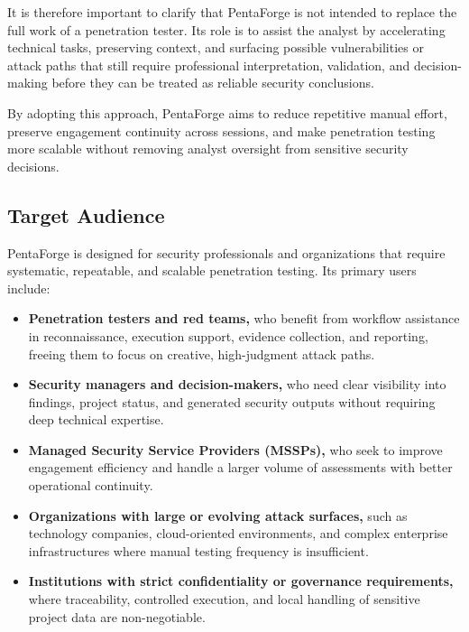 \documentclass[12pt,a4paper]{report}
\begin{document}
It is therefore important to clarify that PentaForge is not intended to replace the
full work of a penetration tester. Its role is to assist the analyst by accelerating
technical tasks, preserving context, and surfacing possible vulnerabilities or attack
paths that still require professional interpretation, validation, and decision-making
before they can be treated as reliable security conclusions.

By adopting this approach, PentaForge aims to reduce repetitive manual effort,
preserve engagement continuity across sessions, and make penetration testing more
scalable without removing analyst oversight from sensitive security decisions.

\subsection{Target Audience}

PentaForge is designed for security professionals and organizations that require
systematic, repeatable, and scalable penetration testing. Its primary users include:

\begin{itemize}
    \item \textbf{Penetration testers and red teams,} who benefit from workflow
    assistance in reconnaissance, execution support, evidence collection, and
    reporting, freeing them to focus on creative, high-judgment attack paths.

    \item \textbf{Security managers and decision-makers,} who need clear visibility
    into findings, project status, and generated security outputs without requiring
    deep technical expertise.

    \item \textbf{Managed Security Service Providers (MSSPs),} who seek to improve
    engagement efficiency and handle a larger volume of assessments with better
    operational continuity.

    \item \textbf{Organizations with large or evolving attack surfaces,} such as
    technology companies, cloud-oriented environments, and complex enterprise
    infrastructures where manual testing frequency is insufficient.

    \item \textbf{Institutions with strict confidentiality or governance
    requirements,} where traceability, controlled execution, and local handling
    of sensitive project data are non-negotiable.
\end{itemize}
\end{document}
